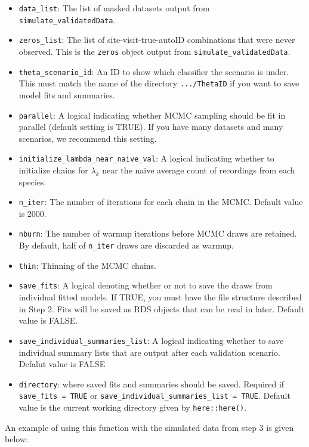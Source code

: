 \documentclass[
]{article}
\providecommand{\tightlist}{%
  \setlength{\itemsep}{0pt}\setlength{\parskip}{0pt}}
\begin{document}
\begin{itemize}
\tightlist
\item
  \texttt{data\_list}: The list of masked datasets output from \texttt{simulate\_validatedData}.
\item
  \texttt{zeros\_list}: The list of site-visit-true-autoID combinations that were never observed. This is the \texttt{zeros} object output from \texttt{simulate\_validatedData}.
\item
  \texttt{theta\_scenario\_id}: An ID to show which classifier the scenario is under. This must match the name of the directory \texttt{.../ThetaID} if you want to save model fits and summaries.
\item
  \texttt{parallel}: A logical indicating whether MCMC sampling should be fit in parallel (default setting is TRUE). If you have many datasets and many scenarios, we recommend this setting.
\item
  \texttt{initialize\_lambda\_near\_naive\_val}: A logical indicating whether to initialize chains for \(\lambda_k\) near the naive average count of recordings from each species.
\item
  \texttt{n\_iter}: The number of iterations for each chain in the MCMC. Default value is 2000.
\item
  \texttt{nburn}: The number of warmup iterations before MCMC draws are retained. By default, half of \texttt{n\_iter} draws are discarded as warmup.
\item
  \texttt{thin}: Thinning of the MCMC chains.
\item
  \texttt{save\_fits}: A logical denoting whether or not to save the draws from individual fitted models. If TRUE, you must have the file structure described in Step 2. Fits will be saved as RDS objects that can be read in later. Default value is FALSE.\\
\item
  \texttt{save\_individual\_summaries\_list}: A logical indicating whether to save individual summary lists that are output after each validation scenario. Defalut value is FALSE
\item
  \texttt{directory}: where saved fits and summaries should be saved. Required if \texttt{save\_fits\ =\ TRUE} or \texttt{save\_individual\_summaries\_list\ =\ TRUE}. Default value is the current working directory given by \texttt{here::here()}.
\end{itemize}

An example of using this function with the simulated data from step 3 is given below:
\end{document}
